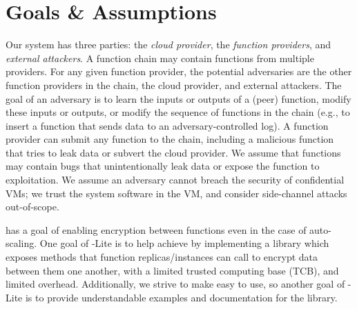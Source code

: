 \section{Goals \& Assumptions}
\label{sec:motivation}

%
Our \SystemName system has three parties: the \emph{cloud provider}, the
\emph{function providers}, and \emph{external attackers}.
%
A function chain may contain functions from multiple providers.
%
For any given function provider, the potential adversaries
are the other function providers in the chain, the cloud provider, and
external attackers.
%
The goal of an adversary is to learn the inputs or outputs of a (peer)
function, modify these inputs or outputs, or modify the sequence of functions
in the chain (e.g., to insert a function that sends data to an
adversary-controlled log).
%
A function provider can submit any function to the chain, including a
malicious function that tries to leak data or subvert the cloud
provider.
%
We assume that functions may contain bugs that unintentionally leak
data or expose the function to exploitation.
%
We assume an adversary cannot breach the security of confidential VMs; we trust
the system software in the VM, and consider side-channel attacks out-of-scope.
%

%
\SystemName has a goal of enabling encryption between functions even in the
case of auto-scaling.
%
One goal of \SystemName-Lite is to help achieve \SystemName by implementing a
library which exposes methods that function replicas/instances can call to
encrypt data between them one another, with a limited trusted computing base
(TCB), and limited overhead.
%
Additionally, we strive to make \SystemName easy to use, so another goal of
\SystemName-Lite is to provide understandable examples and documentation for
the \SystemName library.

